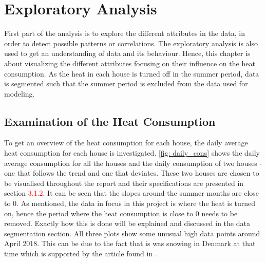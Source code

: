 \chapter{Exploratory Analysis}
First part of the analysis is to explore the different attributes in the data, in order to detect possible patterns or correlations. The exploratory analysis is also used to get an understanding of data and its behaviour. Hence, this chapter is about visualizing the different attributes focusing on their influence on the heat consumption. As the heat in each house is turned off in the summer period, data is segmented such that the summer period is excluded from the data used for modeling. \\

\section{Examination of the Heat Consumption}
\noindent To get an overview of the heat consumption for each house, the daily average heat consumption for each house is investigated. \cref{fig: daily_cons} shows the daily average consumption for all the houses and the daily consumption of two houses - one that follows the trend and one that deviates. These two houses are chosen to be visualised throughout the report and their specifications are presented in section \textcolor{red}{3.1.2}. It can be seen that the slopes around the summer months are close to 0. As mentioned, the data in focus in this project is where the heat is turned on, hence the period where the heat consumption is close to 0 needs to be removed. Exactly how this is done will be explained and discussed in the data segmentation section. All three plots show some unusual high data points around April 2018. This can be due to the fact that is was snowing in Denmark at that time which is supported by the article found in \cite{vejr2018}. \\
